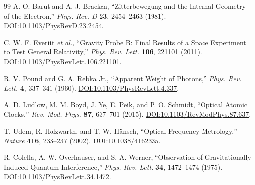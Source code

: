 \documentclass[%
 reprint,
 amsmath,amssymb,
 aps,
]{revtex4-1}
\numberwithin{equation}{section}%
\begin{document}
\begin{thebibliography}{99}
A. O. Barut and A. J. Bracken,
``Zitterbewegung and the Internal Geometry of the Electron,''
\textit{Phys. Rev. D} \textbf{23}, 2454--2463 (1981).
\href{https://doi.org/10.1103/PhysRevD.23.2454}{DOI:10.1103/PhysRevD.23.2454}.

C. W. F. Everitt \textit{et al.},
``Gravity Probe B: Final Results of a Space Experiment to Test General Relativity,''
\textit{Phys. Rev. Lett.} \textbf{106}, 221101 (2011).
\href{https://doi.org/10.1103/PhysRevLett.106.221101}{DOI:10.1103/PhysRevLett.106.221101}.

R. V. Pound and G. A. Rebka Jr.,
``Apparent Weight of Photons,''
\textit{Phys. Rev. Lett.} \textbf{4}, 337--341 (1960).
\href{https://doi.org/10.1103/PhysRevLett.4.337}{DOI:10.1103/PhysRevLett.4.337}.

A. D. Ludlow, M. M. Boyd, J. Ye, E. Peik, and P. O. Schmidt,
``Optical Atomic Clocks,''
\textit{Rev. Mod. Phys.} \textbf{87}, 637--701 (2015).
\href{https://doi.org/10.1103/RevModPhys.87.637}{DOI:10.1103/RevModPhys.87.637}.

T. Udem, R. Holzwarth, and T. W. Hänsch,
``Optical Frequency Metrology,''
\textit{Nature} \textbf{416}, 233--237 (2002).
\href{https://doi.org/10.1038/416233a}{DOI:10.1038/416233a}.

R. Colella, A. W. Overhauser, and S. A. Werner,
``Observation of Gravitationally Induced Quantum Interference,''
\textit{Phys. Rev. Lett.} \textbf{34}, 1472--1474 (1975).
\href{https://doi.org/10.1103/PhysRevLett.34.1472}{DOI:10.1103/PhysRevLett.34.1472}.

\end{thebibliography}
\end{document}
